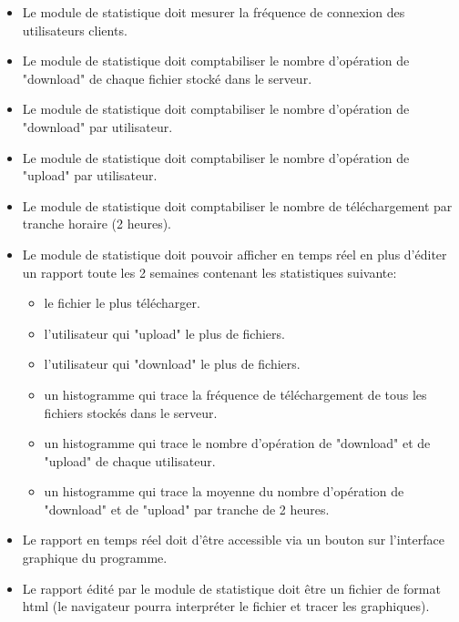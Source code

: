 \documentclass[10pt,a4paper]{report}
\begin{document}
\begin{itemize}[label = $\triangleright$]
\item Le module de statistique doit mesurer la fréquence de connexion des utilisateurs clients.

\item Le module de statistique doit comptabiliser le nombre d'opération de "download" de chaque fichier stocké dans le serveur.

\item Le module de statistique doit comptabiliser le nombre d'opération de "download" par utilisateur.

\item Le module de statistique doit comptabiliser le nombre d'opération de "upload" par utilisateur.

\item Le module de statistique doit comptabiliser le nombre de téléchargement par tranche horaire (2 heures).

\item Le module de statistique doit pouvoir afficher en temps réel en plus d'éditer un rapport toute les 2 semaines contenant les statistiques suivante:

\indent
\begin{itemize}
\item le fichier le plus télécharger.

\item l'utilisateur qui "upload" le plus de fichiers.

\item l'utilisateur qui "download" le plus de fichiers.

\item un histogramme qui trace la fréquence de téléchargement de tous les fichiers stockés dans le serveur.

\item un histogramme qui trace le nombre d'opération de "download" et de "upload" de chaque utilisateur.

\item un histogramme qui trace la moyenne du nombre d'opération de "download" et de "upload" par tranche de 2 heures.
\end{itemize}

\item Le rapport en temps réel doit d'être accessible via un bouton sur l'interface graphique du programme.

\item Le rapport édité par le module de statistique doit être un fichier de format html (le navigateur pourra interpréter le fichier et tracer les graphiques).
\end{itemize}
\end{document}
